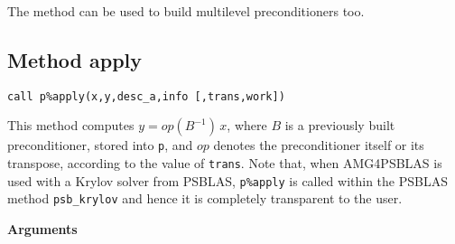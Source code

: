 \noindent
The method can be used to build multilevel preconditioners too.


\clearpage
\subsection{Method apply\label{sec:precapply}}

\begin{center}
\verb|call p%apply(x,y,desc_a,info [,trans,work])|\\
\end{center}

\noindent
This method computes $y = op(B^{-1})\, x$, where $B$ is a previously built
preconditioner, stored into \verb|p|, and $op$
denotes the preconditioner itself or its transpose, according to
the value of \verb|trans|.
Note that, when AMG4PSBLAS is used with a Krylov solver from PSBLAS,
\verb|p%apply| is called within the PSBLAS method \verb|psb_krylov|
and hence it is completely transparent to the user.

{\baselineskip\noindent\large\bfseries Arguments} \smallskip

